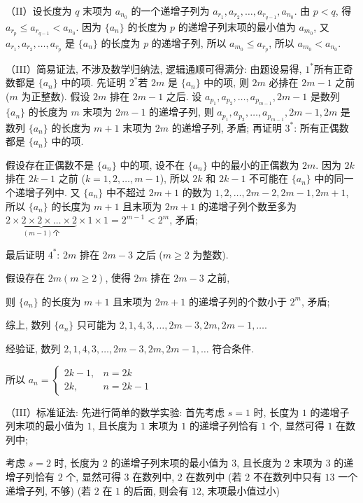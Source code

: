 \begin{solutions}
（II）设长度为 $q$ 末项为 $a_{n_0}$ 的一个递增子列为 $a_{r_1}, a_{r_2}, \dots, a_{r_{q-1}}, a_{n_0}$.
由 $p < q$, 得 $a_{r_p} \leqslant a_{r_{q-1}} < a_{n_0}$.
因为 $\{a_n\}$ 的长度为 $p$ 的递增子列末项的最小值为 $a_{m_0}$,
又 $a_{r_1}, a_{r_2}, \dots, a_{r_p}$ 是 $\{a_n\}$ 的长度为 $p$ 的递增子列,
所以 $a_{m_0} \leqslant a_{r_p}$, 所以 $a_{m_0} < a_{n_0}$.

（III）简易证法, 不涉及数学归纳法, 逻辑通顺可得满分:
由题设易得, $1^*$所有正奇数都是 $\{a_n\}$ 中的项.
先证明 $2^*$若 $2m$ 是 $\{a_n\}$ 中的项, 则 $2m$ 必排在 $2m-1$ 之前 ($m$ 为正整数).
假设 $2m$ 排在 $2m-1$ 之后.
设 $a_{p_1}, a_{p_2}, \dots, a_{p_{m-1}}, 2m-1$ 是数列 $\{a_n\}$ 的长度为 $m$ 末项为 $2m-1$ 的递增子列, 则
$a_{p_1}, a_{p_2}, \dots, a_{p_{m-1}}, 2m-1, 2m$ 是数列 $\{a_n\}$ 的长度为 $m+1$ 末项为 $2m$ 的递增子列, 矛盾;
再证明 $3^*$: 所有正偶数都是 $\{a_n\}$ 中的项.

假设存在正偶数不是 $\{a_n\}$ 中的项, 设不在 $\{a_n\}$ 中的最小的正偶数为 $2m$. 因为 $2k$ 排在 $2k-1$ 之前 ($k=1,2,\dots,m-1$), 所以 $2k$ 和 $2k-1$ 不可能在 $\{a_n\}$ 中的同一个递增子列中. 又 $\{a_n\}$ 中不超过 $2m+1$ 的数为 $1,2,\dots,2m-2,2m-1,2m+1$, 所以 $\{a_n\}$ 的长度为 $m+1$ 且末项为 $2m+1$ 的递增子列个数至多为 $\underbrace{2 \times 2 \times 2 \times \dots \times 2}_{(m-1)\text{个}} \times 1 \times 1 = 2^{m-1} < 2^m$, 矛盾;

最后证明 $4^*$: $2m$ 排在 $2m-3$ 之后 ($m \geqslant 2$ 为整数).

假设存在 $2m (m \geqslant 2)$, 使得 $2m$ 排在 $2m-3$ 之前,

则 $\{a_n\}$ 的长度为 $m+1$ 且末项为 $2m+1$ 的递增子列的个数小于 $2^m$, 矛盾;

综上, 数列 $\{a_n\}$ 只可能为 $2,1,4,3,\dots,2m-3,2m,2m-1,\dots$.

经验证, 数列 $2,1,4,3,\dots,2m-3,2m,2m-1,\dots$ 符合条件.

所以 $a_n = \begin{cases} 2k-1, & n=2k \\ 2k, & n=2k-1 \end{cases}$

（III）标准证法: 先进行简单的数学实验:
首先考虑 $s=1$ 时,
长度为 $1$ 的递增子列末项的最小值为 $1$, 且长度为 $1$ 末项为 $1$ 的递增子列恰有 $1$ 个,
显然可得 $1$ 在数列中;

考虑 $s=2$ 时,
长度为 $2$ 的递增子列末项的最小值为 $3$, 且长度为 $2$ 末项为 $3$ 的递增子列恰有 $2$ 个,
显然可得 $3$ 在数列中,
$2$ 在数列中 (若 $2$ 不在数列中只有 $13$ 一个递增子列, 不够)
(若 $2$ 在 $1$ 的后面, 则会有 $12$, 末项最小值过小)


\end{solutions}
